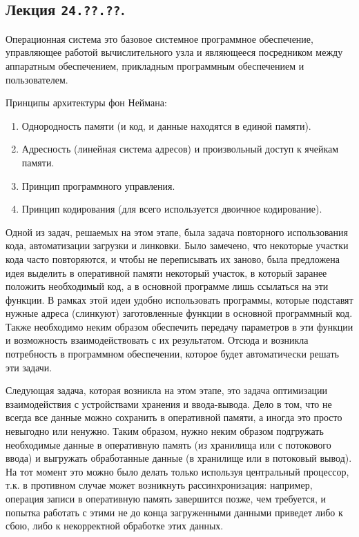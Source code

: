 \subsection{%
  Лекция \texttt{24.??.??}.%
}


\begin{definition}
  Операционная система это базовое системное программное обеспечение,
  управляющее работой вычислительного узла и являющееся посредником между
  аппаратным обеспечением, прикладным программным обеспечением и пользователем.
\end{definition}

Принципы архитектуры фон Неймана:

\begin{enumerate}
\item
  Однородность памяти (и код, и данные находятся в единой памяти).

\item
  Адресность (линейная система адресов) и произвольный доступ к ячейкам памяти.

\item
  Принцип программного управления.

\item
  Принцип кодирования (для всего используется двоичное кодирование).
\end{enumerate}


Одной из задач, решаемых на этом этапе, была задача повторного использования
кода, автоматизации загрузки и линковки. Было замечено, что некоторые участки
кода часто повторяются, и чтобы не переписывать их заново, была предложена идея
выделить в оперативной памяти некоторый участок, в который заранее положить
необходимый код, а в основной программе лишь ссылаться на эти функции. В рамках
этой идеи удобно использовать программы, которые подставят нужные адреса
(слинкуют) заготовленные функции в основной программный код. Также необходимо
неким образом обеспечить передачу параметров в эти функции и возможность
взаимодействовать с их результатом. Отсюда и возникла потребность в программном
обеспечении, которое будет автоматически решать эти задачи.

Следующая задача, которая возникла на этом этапе, это задача оптимизации
взаимодействия с устройствами хранения и ввода-вывода. Дело в том, что не всегда
все данные можно сохранить в оперативной памяти, а иногда это просто невыгодно
или ненужно. Таким образом, нужно неким образом подгружать необходимые данные в
оперативную память (из хранилища или с потокового ввода) и выгружать
обработанные данные (в хранилище или в потоковый вывод). На тот момент это можно
было делать только используя центральный процессор, т.к. в противном случае
может возникнуть рассинхронизация: например, операция записи в оперативную
память завершится позже, чем требуется, и попытка работать с этими не до конца
загруженными данными приведет либо к сбою, либо к некорректной обработке этих
данных.

